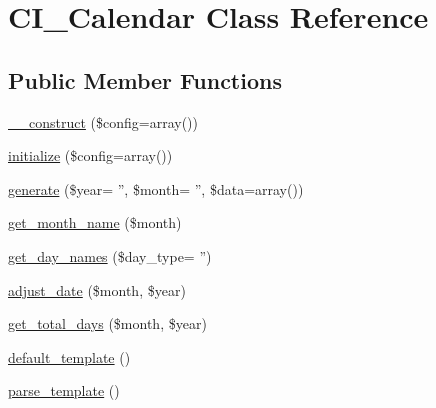 \hypertarget{class_c_i___calendar}{\section{C\-I\-\_\-\-Calendar Class Reference}
\label{class_c_i___calendar}
}
\subsection*{Public Member Functions}
\begin{DoxyCompactItemize}
\item 
\hyperlink{class_c_i___calendar_af7f9493844d2d66e924e3c1df51ce616}{\-\_\-\-\_\-construct} (\$config=array())
\item 
\hyperlink{class_c_i___calendar_a481385e36d920f5a5005ace05c6cd016}{initialize} (\$config=array())
\item 
\hyperlink{class_c_i___calendar_a532f3b6ce22d22e01ace95a24a6f7179}{generate} (\$year= '', \$month= '', \$data=array())
\item 
\hyperlink{class_c_i___calendar_a056208e620b0ffc2525a07d8646eb194}{get\-\_\-month\-\_\-name} (\$month)
\item 
\hyperlink{class_c_i___calendar_ac0f5e250a3694e74e4a160557f91b8ca}{get\-\_\-day\-\_\-names} (\$day\-\_\-type= '')
\item 
\hyperlink{class_c_i___calendar_ac216356ab0ff31e8538fd9208a26577a}{adjust\-\_\-date} (\$month, \$year)
\item 
\hyperlink{class_c_i___calendar_a3c863f62907e445af2711df11fb90ff9}{get\-\_\-total\-\_\-days} (\$month, \$year)
\item 
\hyperlink{class_c_i___calendar_a5d174710ed7a2a08df21dbaa2bb6a50f}{default\-\_\-template} ()
\item 
\hyperlink{class_c_i___calendar_ac0331959620d18320ab6587621730d44}{parse\-\_\-template} ()
\end{DoxyCompactItemize}
